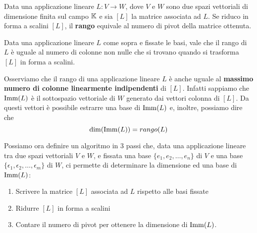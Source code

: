 \begin{definition}
	Data una applicazione lineare $L : V \to W$, dove $V$ e $W$ sono due spazi
	vettoriali di dimensione finita sul campo $\mathbb{K}$ e sia $[L]$ la matrice
	associata ad $L$. Se riduco in forma a scalini $[L]$, il \textbf{rango} equivale
	al numero di pivot della matrice ottenuta.
\end{definition}

\begin{theorem}
	Data una applicazione lineare $L$ come sopra e fissate le basi, vale che
	il rango di $L$ è uguale al numero di colonne non nulle che si trovano
	quando si trasforma $[L]$ in forma a scalini.
\end{theorem}

\begin{observation}
	Osserviamo che il rango di una applicazione lineare $L$ è anche uguale al
	\textbf{massimo numero di colonne linearmente indipendenti} di $[L]$.
	Infatti sappiamo che $\operatorname{Imm}(L)$ è il sottospazio vettoriale di $W$ generato
	dai vettori colonna di $[L]$. Da questi vettori è possibile estrarre una
	base di $\operatorname{Imm}(L)$ e, inoltre, possiamo dire che \[\dim(\operatorname{Imm}(L)) = rango (L)\]
\end{observation}

\begin{observation}
	Possiamo ora definire un algoritmo in 3 passi che, data una
	applicazione lineare tra due spazi vettoriali $V$ e $W$, e fissata una base
	$\{e_1, e_2, \dots, e_n\}$ di $V$ e una base
	$\{\epsilon_1, \epsilon_2, \dots, \epsilon_m\}$ di $W$, ci permette di
	determinare la dimensione ed una base di $\operatorname{Imm}(L)$:
	\begin{enumerate}
		\item Scrivere la matrice $[L]$ associata ad $L$ rispetto alle basi
		      fissate
		\item Ridurre $[L]$ in forma a scalini
		\item Contare il numero di pivot per ottenere la dimensione di $\operatorname{Imm}(L)$.
	\end{enumerate}
\end{observation}


